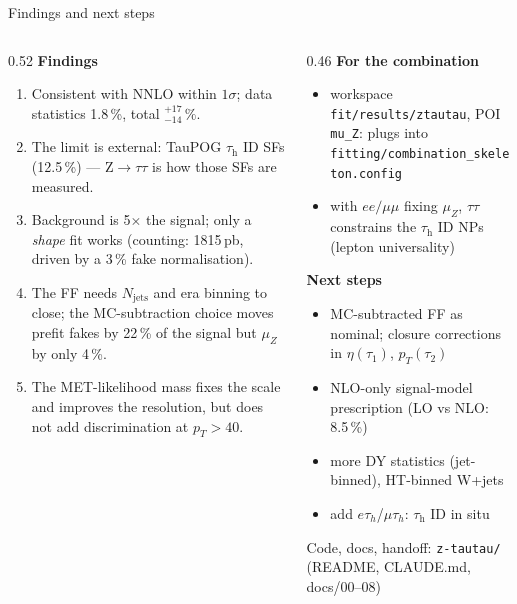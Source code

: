 \documentclass[aspectratio=169,9pt]{beamer}
\newcommand{\tauh}{\ensuremath{\tau_\mathrm{h}}}
\begin{document}
\begin{frame}{Findings and next steps}
\begin{columns}[T]
\begin{column}{0.52\textwidth}
\textbf{Findings}
\small
\begin{enumerate}\setlength\itemsep{2pt}
\item Consistent with NNLO within $1\sigma$; data statistics 1.8\,\%, total $^{+17}_{-14}\,\%$.
\item \alert{The limit is external}: TauPOG \tauh{} ID SFs (12.5\,\%) --- Z$\rightarrow\tau\tau$ is how those SFs are measured.
\item Background is 5$\times$ the signal; only a \emph{shape} fit works (counting: 1815\,pb, driven by a 3\,\% fake normalisation).
\item The FF needs $N_\mathrm{jets}$ and era binning to close; the MC-subtraction choice moves prefit fakes by 22\,\% of the signal but $\mu_Z$ by only 4\,\%.
\item The MET-likelihood mass fixes the scale and improves the resolution, but does not add discrimination at $p_T>40$.
\end{enumerate}
\end{column}
\begin{column}{0.46\textwidth}
\textbf{For the combination}
\small
\begin{itemize}\setlength\itemsep{1pt}
\item workspace \texttt{fit/results/ztautau}, POI \texttt{mu\_Z}: plugs into \texttt{fitting/combination\_skeleton.config}
\item with $ee/\mu\mu$ fixing $\mu_Z$, $\tau\tau$ constrains the \tauh{} ID NPs (lepton universality)
\end{itemize}
\textbf{Next steps}
\begin{itemize}\setlength\itemsep{1pt}
\item MC-subtracted FF as nominal; closure corrections in $\eta(\tau_1)$, $p_T(\tau_2)$
\item NLO-only signal-model prescription (LO vs NLO: 8.5\,\%)
\item more DY statistics (jet-binned), HT-binned W+jets
\item add $e\tau_h$/$\mu\tau_h$: \tauh{} ID in situ
\end{itemize}
\scriptsize Code, docs, handoff: \texttt{z-tautau/} (README, CLAUDE.md, docs/00--08)
\end{column}
\end{columns}
\end{frame}
\end{document}
